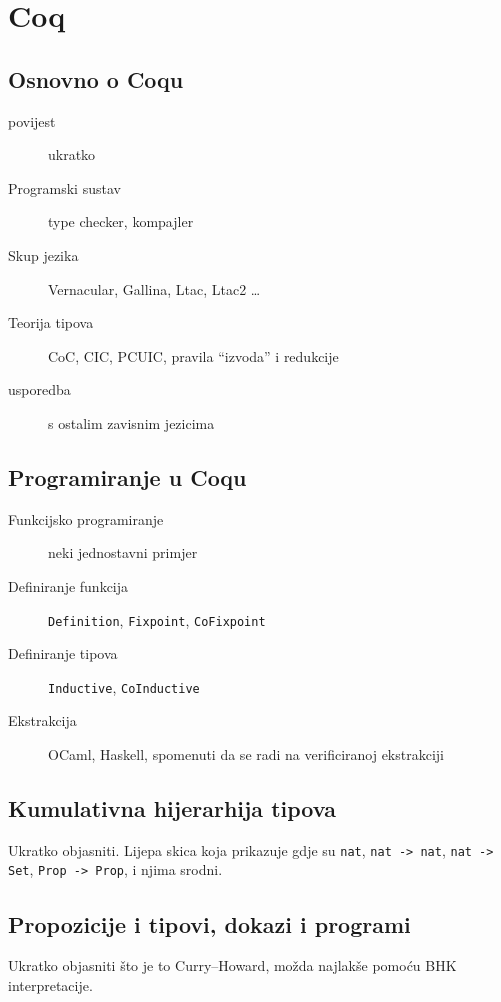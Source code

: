 \chapter{Coq}\label{pog:glavni_dio}

\section{Osnovno o Coqu}\label{sec:osnovno-o-coqu}

\begin{description}             
\item[povijest] ukratko
\item[Programski sustav] type checker, kompajler
\item[Skup jezika] Vernacular, Gallina, Ltac, Ltac2 \ldots
\item[Teorija tipova] CoC, CIC, PCUIC, pravila ``izvoda'' i redukcije
\item[usporedba] s ostalim zavisnim jezicima
\end{description}

\section{Programiranje u Coqu}\label{sec:programiranje-u-coqu}
\begin{description}
\item[Funkcijsko programiranje] neki jednostavni primjer
\item[Definiranje funkcija] \texttt{Definition}, \texttt{Fixpoint}, \texttt{CoFixpoint}
\item[Definiranje tipova] \texttt{Inductive}, \texttt{CoInductive}
\item[Ekstrakcija] OCaml, Haskell, spomenuti da se radi na verificiranoj ekstrakciji
\end{description}

\section{Kumulativna hijerarhija tipova}\label{sec:kumul-hijer-tipova}
Ukratko objasniti. Lijepa skica koja prikazuje gdje su \texttt{nat}, \texttt{nat -> nat}, \texttt{nat -> Set}, \texttt{Prop -> Prop}, i njima srodni.

\section{Propozicije i tipovi, dokazi i programi}\label{sec:propozicije-i-tipovi}
Ukratko objasniti što je to Curry--Howard, možda najlakše pomoću BHK interpretacije.

